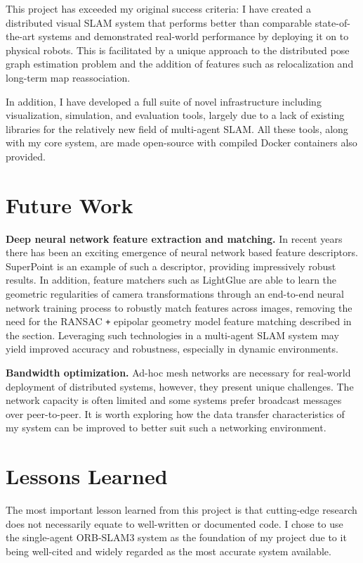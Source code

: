 

\label{sec:5}
This project has exceeded my original success criteria: I have created a distributed visual SLAM system that performs better than comparable state-of-the-art systems and demonstrated real-world performance by deploying it on to physical robots. This is facilitated by a unique approach to the distributed pose graph estimation problem and the addition of features such as relocalization and long-term map reassociation.

In addition, I have developed a full suite of novel infrastructure including visualization, simulation, and evaluation tools, largely due to a lack of existing libraries for the relatively new field of multi-agent SLAM. All these tools, along with my core system, are made open-source with compiled Docker containers also provided.

\section{Future Work}
\label{sec:future-work}
\textbf{Deep neural network feature extraction and matching.} In recent years there has been an exciting emergence of neural network based feature descriptors. SuperPoint \autocite{detone18superpoint} is an example of such a descriptor, providing impressively robust results. In addition, feature matchers such as LightGlue \autocite{lindenberger2023lightglue} are able to learn the geometric regularities of camera transformations through an end-to-end neural network training process to robustly match features across images, removing the need for the RANSAC \texttt{+} epipolar geometry model feature matching described in the  section. Leveraging such technologies in a multi-agent SLAM system may yield improved accuracy and robustness, especially in dynamic environments.

\textbf{Bandwidth optimization.} Ad-hoc mesh networks are necessary for real-world deployment of distributed systems, however, they present unique challenges. The network capacity is often limited and some systems prefer broadcast messages over peer-to-peer. It is worth exploring how the data transfer characteristics of my system can be improved to better suit such a networking environment.

\section{Lessons Learned}
\label{sec:lessons-learned}
The most important lesson learned from this project is that cutting-edge research does not necessarily equate to well-written or documented code. I chose to use the single-agent ORB-SLAM3 system as the foundation of my project due to it being well-cited and widely regarded as the most accurate system available.


